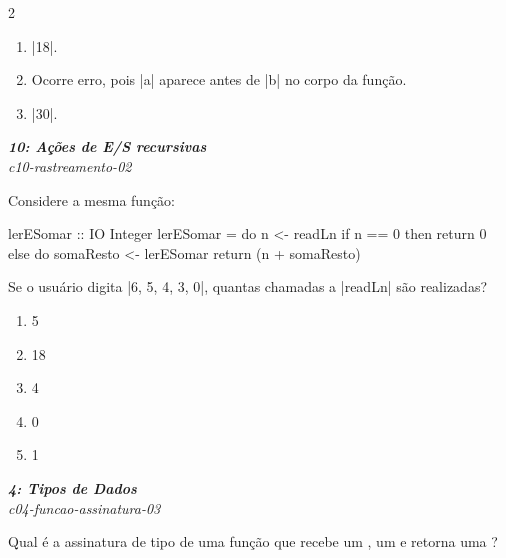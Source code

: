 \documentclass[a4paper,10pt,brazil]{article}
\begin{document}
\begin{multicols}{2}
\begin{enumerate}
  \item \haskellinline|18|.

  \item Ocorre erro, pois \haskellinline|a| aparece antes de \haskellinline|b| no corpo da função.

  \item \haskellinline|30|.


\end{enumerate}

\begin{flushright}
  \footnotesize
  \textit{\textbf{10: Ações de E/S recursivas}}\\
  \textit{c10-rastreamento-02}\\

\end{flushright}
Considere a mesma função:

\begin{haskellcode}
lerESomar :: IO Integer
lerESomar = do
  n <- readLn
  if n == 0
    then return 0
    else do
      somaResto <- lerESomar
      return (n + somaResto)
\end{haskellcode}

Se o usuário digita \haskellinline|6, 5, 4, 3, 0|, quantas chamadas a \haskellinline|readLn| são realizadas?

\begin{enumerate}
  \item 5

  \item 18

  \item 4

  \item 0

  \item 1


\end{enumerate}

\begin{flushright}
  \footnotesize
  \textit{\textbf{4: Tipos de Dados}}\\
  \textit{c04-funcao-assinatura-03}\\

\end{flushright}
Qual é a assinatura de tipo de uma função que recebe um , um  e retorna uma ?


\end{multicols}
\end{document}
